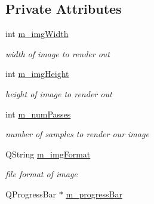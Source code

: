 \subsection*{Private Attributes}
\begin{DoxyCompactItemize}
\item 
\hypertarget{class_render_settings_a660f402769e91efbfd4cdf2520937d3b}{int \hyperlink{class_render_settings_a660f402769e91efbfd4cdf2520937d3b}{m\-\_\-img\-Width}}\label{class_render_settings_a660f402769e91efbfd4cdf2520937d3b}

\begin{DoxyCompactList}\small\item\em width of image to render out \end{DoxyCompactList}\item 
\hypertarget{class_render_settings_a57b8cdfc1cb7b59fae53310f3332d2dd}{int \hyperlink{class_render_settings_a57b8cdfc1cb7b59fae53310f3332d2dd}{m\-\_\-img\-Height}}\label{class_render_settings_a57b8cdfc1cb7b59fae53310f3332d2dd}

\begin{DoxyCompactList}\small\item\em height of image to render out \end{DoxyCompactList}\item 
\hypertarget{class_render_settings_ad560caee01c81f4922066ee74abb1ad7}{int \hyperlink{class_render_settings_ad560caee01c81f4922066ee74abb1ad7}{m\-\_\-num\-Passes}}\label{class_render_settings_ad560caee01c81f4922066ee74abb1ad7}

\begin{DoxyCompactList}\small\item\em number of samples to render our image \end{DoxyCompactList}\item 
\hypertarget{class_render_settings_a8c1825b6604cf0a5cff031888f62516a}{Q\-String \hyperlink{class_render_settings_a8c1825b6604cf0a5cff031888f62516a}{m\-\_\-img\-Format}}\label{class_render_settings_a8c1825b6604cf0a5cff031888f62516a}

\begin{DoxyCompactList}\small\item\em file format of image \end{DoxyCompactList}\item 
\hypertarget{class_render_settings_a81ca37e9847b1ed469ced00d965ad291}{Q\-Progress\-Bar $\ast$ \hyperlink{class_render_settings_a81ca37e9847b1ed469ced00d965ad291}{m\-\_\-progress\-Bar}}\label{class_render_settings_a81ca37e9847b1ed469ced00d965ad291}


\end{DoxyCompactItemize}
